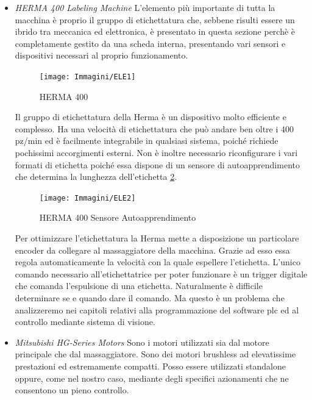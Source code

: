 \documentclass[12pt, a4paper, oneside]{book}
\begin{document}
\begin{itemize}
	
	\item \textit{HERMA 400 Labeling Machine}	
	L'elemento più importante di tutta la macchina è proprio il gruppo di etichettatura che, sebbene risulti essere un ibrido tra meccanica ed elettronica, è presentato in questa sezione perchè è completamente gestito da una scheda interna, presentando vari sensori e dispositivi necessari al proprio funzionamento.
	

	
	\begin{figure}[H]
		\centering
		\texttt{[image: Immagini/ELE1]}
		\label{ele1}
		\caption{HERMA 400}
	\end{figure}
	
	
	Il gruppo di etichettatura della Herma è un dispositivo molto efficiente e complesso. Ha una velocità di etichettatura che può andare ben oltre i 400 pz/min ed è facilmente integrabile in qualsiasi sistema, poiché richiede pochissimi accorgimenti esterni. Non è inoltre necessario riconfigurare i vari formati di etichetta poiché essa dispone di un sensore di autoapprendimento che determina la lunghezza dell'etichetta \ref{ele2}.
	
		\begin{figure}[H]
		\centering
		\texttt{[image: Immagini/ELE2]}
		\label{ele2}
		\caption{HERMA 400 Sensore Autoapprendimento}
	\end{figure}
	
	 Per ottimizzare l'etichettatura la Herma mette a disposizione un particolare encoder da collegare al massaggiatore della macchina. Grazie ad esso essa regola automaticamente la velocità con la quale espellere l'etichetta. L'unico comando necessario all'etichettatrice per poter funzionare è un trigger digitale che comanda l'espulsione di una etichetta. Naturalmente è difficile determinare se e quando dare il comando. Ma questo è un problema che analizzeremo nei capitoli relativi alla programmazione del software plc ed al controllo mediante sistema di visione.  
	
	\item \textit{Mitsubishi HG-Series Motors}
	Sono i motori utilizzati sia dal motore principale che dal massaggiatore. Sono dei motori brushless ad elevatissime prestazioni ed estremamente compatti. Posso essere utilizzati standalone oppure, come nel nostro caso, mediante degli specifici azionamenti che ne consentono un pieno controllo. 
	

\end{itemize}
\end{document}
